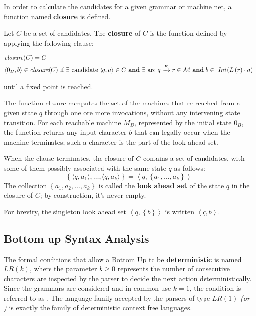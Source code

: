 \documentclass[english]{article}
\begin{document}
In order to calculate the candidates for a given grammar or machine net, a function named \textbf{closure} is defined.

\bigskip
Let \(C\) be a set of candidates.
The \textbf{closure} of \(C\) is the function defined by applying the following clause:

\begin{gather*}
  \begin{aligned}
    & \textit{closure}(C) = C                          \\
    & \langle 0_B, b \rangle \in \textit{closure}(C) \ \text{if} \ \exists \ \text{candidate} \ \langle q,a \rangle \in C \ \textbf{and} \ \exists \ \text{arc} \  q\xrightarrow{B} r \in \mathcal{M} \ \textbf{and} \ b \in \ \Ini \left( L \left( r \right) \cdot a \right) \\
  \end{aligned}
\end{gather*}

until a fixed point is reached.

\bigskip
The function closure computes the set of the machines that re reached from a given state \(q\) through one ore more invocations, without any intervening state transition.
For each reachable machine \(M_B\), represented by the initial state \(0_B\), the function returns any input character \(b\) that can legally occur when the machine terminates;
such a character is the part of the look ahead set.

When the clause terminates, the closure of \(C\) contains a set of candidates, with some of them possibly associated with the same state \(q\) as follows:
\[ \left\{ \langle q, a_1 \rangle, \ldots, \langle q, a_k \rangle \right\} = \left\langle q, \left\{ a_1, \ldots, a_k \right\} \right\rangle \]
The collection \(\left\{ a_1, a_2, \ldots, a_k \right\}\) is called the \textbf{look ahead set} of the state \(q\) in the closure of \(C\);
by construction, it's never empty.

For brevity, the singleton look ahead set \(\left\langle q, \left\{ b \right\} \right\rangle\) is written \(\left\langle q, b \right\rangle\).

\subsection{Bottom up Syntax Analysis}

The formal conditions that allow a Bottom Up to be \textbf{deterministic} is named \(\textit{LR}(k)\), where the parameter \(k \geq 0\) represents the number of consecutive characters are inspected by the parser to decide the next action deterministically.
Since the \EBNF grammars are considered and in common use \(k=1\), the condition is referred to as \ELRo.
The language family accepted by the parsers of type \(\textit{LR}(1)\) \textit{(or \ELRo)} is exactly the family \DET of deterministic context free languages.
\end{document}
